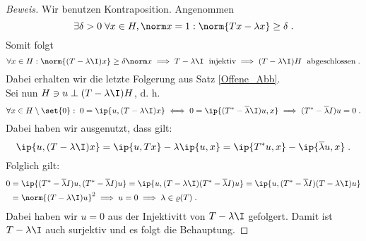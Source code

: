 	\begin{proof}[Beweis]
		Wir benutzen Kontraposition. Angenommen
		\[\exists \delta > 0 \;\forall x \in H, \norm x = 1: \norm{Tx - \lambda x } \geq \delta\;.\]
		Somit folgt
		\[\forall x \in H: \norm{(T-\lambda \I)x} \geq \delta \norm x \implies  T -\lambda \I \;\text{ injektiv} \implies (T-\lambda\I)H \;\text{ abgeschlossen}\;.\]
		Dabei erhalten wir die letzte Folgerung aus Satz \ref{Offene_Abb}.\\
		Sei nun \(H \ni u \perp (T-\lambda\I)H\), d. h. 
		\[\forall x\in H\setminus\set{0}:\; 0 = \ip{u, (T-\lambda\I)x} \iff 0  = \ip{(T^* - \overline\lambda \I)u,x}  \implies  (T^* -\overline \lambda I) u = 0\;.\]
		Dabei haben wir ausgenutzt, dass gilt:
		\[ \ip{u, (T-\lambda\I)x}  = \ip{u,Tx} - \lambda \ip{u,x} = \ip{T^* u, x} - \ip{\overline\lambda u,x}\;. \]
		Folglich gilt:
		\begin{align*}0 &= \ip{(T^* -\overline \lambda I) u,(T^* -\overline \lambda I) u} = \ip{u, (T-\lambda\I)(T^* -\overline \lambda I) u} = \ip{u, (T^* -\overline \lambda I)(T-\lambda\I) u} \\
		&= \norm{(T-\lambda\I)u}^2 \implies u=0 \implies \lambda \in \varrho(T)\;.
		\end{align*}
		Dabei haben wir \(u=0\) aus der Injektivit\as t von \(T-\lambda\I\) gefolgert. Damit ist \(T-\lambda\I\) auch surjektiv und es folgt die Behauptung.
	\end{proof}
	
